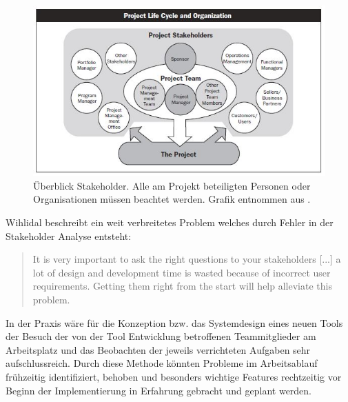 \documentclass[pagesize, paper=a4, fontsize=12pt, titlepage=true, headings=small, headnosepline, abstractoff, liststotoc, nochapterprefix, plainheadsepline, twoside]{scrreprt}
\begin{document}
\begin{figure}[ht]
	\centering
	\includegraphics[width=\linewidth]{Bilder/Stakeholder_Uebersicht.jpg}
	\caption{Überblick Stakeholder. Alle am Projekt beteiligten Personen oder Organisationen müssen beachtet werden. Grafik entnommen aus .}
	\label{StakeholderÜbersicht}
\end{figure}

Wihlidal beschreibt ein weit verbreitetes Problem welches durch Fehler in der Stakeholder Analyse entsteht:
\begin{quote}
\glqq It is very important to ask the right questions to your stakeholders [...] a lot of design and development time is wasted because of incorrect user requirements. Getting them right from the start will help alleviate this problem.\grqq{}
\autocite[S. 28]{Wihlidal2006}
\end{quote}

In der Praxis wäre für die Konzeption bzw. das Systemdesign eines neuen Tools der Besuch der von der Tool Entwicklung betroffenen Teammitglieder am Arbeitsplatz und das Beobachten der jeweils verrichteten Aufgaben sehr aufschlussreich. Durch diese Methode könnten Probleme im Arbeitsablauf frühzeitig identifiziert, behoben und besonders wichtige Features rechtzeitig vor Beginn der Implementierung in Erfahrung gebracht und geplant werden.
\end{document}
